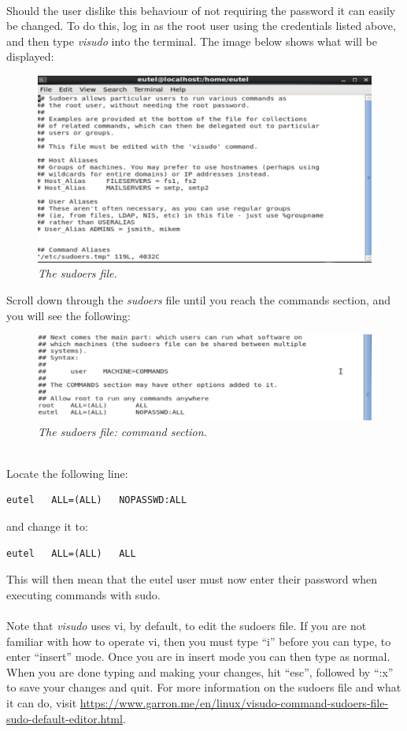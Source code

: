 \documentclass[11pt]{article}
\begin{document}
\paragraph{}
Should the user dislike this behaviour of not requiring the password it can easily be changed. To do this, log in as the root user using the credentials listed above, and then type \textit{visudo} into the terminal. The image below shows what will be displayed:
\begin{figure}[!ht]
	\centering
	\includegraphics[scale=0.3]{images/visudo1.png}
	\caption{\textit{The sudoers file.}}
\end{figure}
Scroll down through the \textit{sudoers} file until you reach the commands section, and you will see the following:
\begin{figure}[!ht]
	\centering
	\includegraphics[scale=0.3]{images/visudo2.png}
	\caption{\textit{The sudoers file: command section.}}
\end{figure}
\\Locate the following line:
\begin{verbatim}
eutel	ALL=(ALL)	NOPASSWD:ALL
\end{verbatim}
and change it to:
\begin{verbatim}
eutel	ALL=(ALL)	ALL
\end{verbatim}
This will then mean that the eutel user must now enter their password when executing commands with sudo.
\paragraph{}
Note that \textit{visudo} uses vi, by default, to edit the sudoers file. If you are not familiar with how to operate vi, then you must type ``i'' before you can type, to enter ``insert'' mode. Once you are in insert mode you can then type as normal. When you are done typing and making your changes, hit ``esc'', followed by ``:x'' to save your changes and quit. For more information on the sudoers file and what it can do, visit \url{https://www.garron.me/en/linux/visudo-command-sudoers-file-sudo-default-editor.html}.
\end{document}

